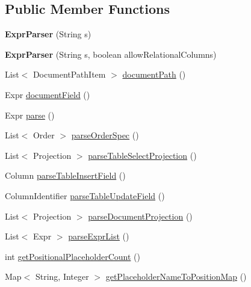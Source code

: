 \subsection*{Public Member Functions}
\begin{DoxyCompactItemize}
\item 
\mbox{\label{classcom_1_1mysql_1_1cj_1_1xdevapi_1_1_expr_parser_ad70ff0dd3eb608b91d106978a6740d49}} 
{\bfseries Expr\+Parser} (String s)
\item 
\mbox{\label{classcom_1_1mysql_1_1cj_1_1xdevapi_1_1_expr_parser_a77381c9ab6c86b7c5fb792ffa16366cc}} 
{\bfseries Expr\+Parser} (String s, boolean allow\+Relational\+Columns)
\item 
List$<$ Document\+Path\+Item $>$ \mbox{\hyperlink{classcom_1_1mysql_1_1cj_1_1xdevapi_1_1_expr_parser_a5739c15d14dc9c0cf24656cd095e2e11}{document\+Path}} ()
\item 
Expr \mbox{\hyperlink{classcom_1_1mysql_1_1cj_1_1xdevapi_1_1_expr_parser_aaabe0dbc40e4e4a9e8af0ee1c357dcdd}{document\+Field}} ()
\item 
Expr \mbox{\hyperlink{classcom_1_1mysql_1_1cj_1_1xdevapi_1_1_expr_parser_a4b585b964454cc26c544d824d33b3498}{parse}} ()
\item 
List$<$ Order $>$ \mbox{\hyperlink{classcom_1_1mysql_1_1cj_1_1xdevapi_1_1_expr_parser_aa948ecc19739c733f80c170943ce53fe}{parse\+Order\+Spec}} ()
\item 
List$<$ Projection $>$ \mbox{\hyperlink{classcom_1_1mysql_1_1cj_1_1xdevapi_1_1_expr_parser_a236fa3f356e511f04e6dfb64a333b354}{parse\+Table\+Select\+Projection}} ()
\item 
Column \mbox{\hyperlink{classcom_1_1mysql_1_1cj_1_1xdevapi_1_1_expr_parser_a2c759e26260efb3a807ea8ca178d7f55}{parse\+Table\+Insert\+Field}} ()
\item 
Column\+Identifier \mbox{\hyperlink{classcom_1_1mysql_1_1cj_1_1xdevapi_1_1_expr_parser_ab2e27d666920b2b5e2985b98a7c658d7}{parse\+Table\+Update\+Field}} ()
\item 
List$<$ Projection $>$ \mbox{\hyperlink{classcom_1_1mysql_1_1cj_1_1xdevapi_1_1_expr_parser_a93ace436851f9df69c5e69828b19d02c}{parse\+Document\+Projection}} ()
\item 
List$<$ Expr $>$ \mbox{\hyperlink{classcom_1_1mysql_1_1cj_1_1xdevapi_1_1_expr_parser_ae0e58b00609560b6a43556d12491d152}{parse\+Expr\+List}} ()
\item 
int \mbox{\hyperlink{classcom_1_1mysql_1_1cj_1_1xdevapi_1_1_expr_parser_a1966233da75608f47433e709b6493adf}{get\+Positional\+Placeholder\+Count}} ()
\item 
Map$<$ String, Integer $>$ \mbox{\hyperlink{classcom_1_1mysql_1_1cj_1_1xdevapi_1_1_expr_parser_a71d5c16a61ebe39a18c6e861f93acaa7}{get\+Placeholder\+Name\+To\+Position\+Map}} ()
\end{DoxyCompactItemize}



